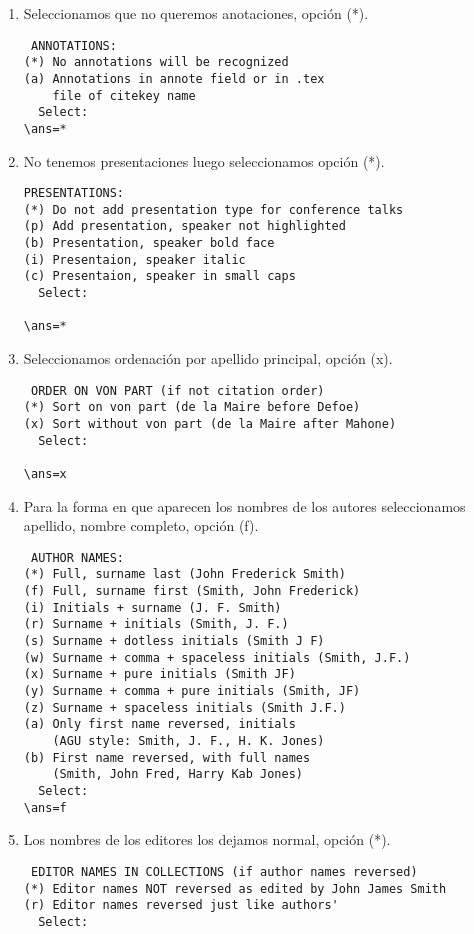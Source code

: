 \begin{enumerate}
\item Seleccionamos que no queremos anotaciones, opción (*).

\begin{verbatim}
 ANNOTATIONS:
(*) No annotations will be recognized
(a) Annotations in annote field or in .tex 
    file of citekey name
  Select: 
\ans=*
\end{verbatim}

\item No tenemos presentaciones luego seleccionamos opción (*).

\begin{verbatim}
PRESENTATIONS:
(*) Do not add presentation type for conference talks
(p) Add presentation, speaker not highlighted 
(b) Presentation, speaker bold face 
(i) Presentaion, speaker italic 
(c) Presentaion, speaker in small caps 
  Select:

\ans=*
\end{verbatim}

\item Seleccionamos ordenación por apellido principal, opción (x).

\begin{verbatim}
 ORDER ON VON PART (if not citation order)
(*) Sort on von part (de la Maire before Defoe)
(x) Sort without von part (de la Maire after Mahone)
  Select:

\ans=x
\end{verbatim}

\item Para la forma en que aparecen los nombres de los autores seleccionamos apellido, nombre completo, opción (f).

\begin{verbatim}
 AUTHOR NAMES:
(*) Full, surname last (John Frederick Smith)
(f) Full, surname first (Smith, John Frederick)
(i) Initials + surname (J. F. Smith)
(r) Surname + initials (Smith, J. F.)
(s) Surname + dotless initials (Smith J F)
(w) Surname + comma + spaceless initials (Smith, J.F.)
(x) Surname + pure initials (Smith JF)
(y) Surname + comma + pure initials (Smith, JF)
(z) Surname + spaceless initials (Smith J.F.)
(a) Only first name reversed, initials 
    (AGU style: Smith, J. F., H. K. Jones)
(b) First name reversed, with full names 
    (Smith, John Fred, Harry Kab Jones)
  Select:
\ans=f
\end{verbatim}
\item  Los nombres de los editores  los dejamos normal, opción (*).

\begin{verbatim}
 EDITOR NAMES IN COLLECTIONS (if author names reversed)
(*) Editor names NOT reversed as edited by John James Smith
(r) Editor names reversed just like authors'
  Select:


\end{verbatim}
\end{enumerate}
